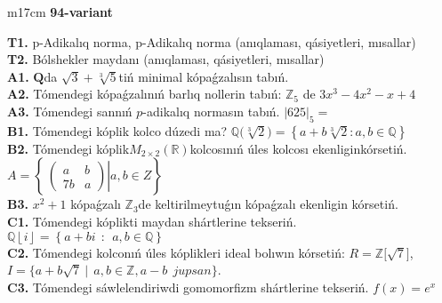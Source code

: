 \documentclass{article}
\begin{document}
\begin{tabular}{m{17cm}}
\textbf{94-variant}
\newline

\textbf{T1.} p-Adikalıq norma, p-Adikalıq norma (anıqlaması, qásiyetleri, mısallar) \\
\textbf{T2.} Bólshekler maydanı (anıqlaması, qásiyetleri, mısallar) \\
\textbf{A1.} \(\mathbf{Q}\)da \(\sqrt{3} + \sqrt[3]{5}\)tiń minimal kópaǵzalısın tabıń. \\
\textbf{A2.} Tómendegi kópaǵzalınıń barlıq nollerin tabıń: \(\mathbb{Z}_{5}\) de \(3x^{3} - 4x^{2} - x + 4\) \\
\textbf{A3.} Tómendegi sannıń \(p\)-adikalıq normasın tabıń. \(|625|_{5} =\) \\
\textbf{B1.} Tómendegi kóplik kolco dúzedi ma? \(\mathbb{Q(}\sqrt[3]{2}) = \left\{ a + b\sqrt[3]{2}:a,b \in \mathbb{Q} \right\}\) \\
\textbf{B2.} Tómendegi kóplik\(M_{2 \times 2}\left( \mathbb{R} \right)\)kolcosınıń úles kolcosı ekenliginkórsetiń. \(A = \left\{ \left. \ \begin{pmatrix}
a & b \\
7b & a
\end{pmatrix} \right|a,b \in Z \right\}\) \\
\textbf{B3.} \(x^{2} + 1\) kópaǵzalı \(\mathbb{Z}_{3}\)de keltirilmeytuǵın kópaǵzalı ekenligin kórsetiń. \\
\textbf{C1.} Tómendegi kóplikti maydan shártlerine tekseriń. \(\mathbb{Q}\left\lfloor i \right\rfloor = \left\{ a + bi\ \ :\ \ a,b\mathbb{\in Q} \right\}\) \\
\textbf{C2.} Tómendegi kolconıń úles kóplikleri ideal bolıwın kórsetiń:
\(R\mathbb{= Z\lbrack}\sqrt{7}\rbrack\), \(I = \{ a + b\sqrt{7}\ |\ \ a,b \in \mathbb{Z,}a - b\ \ jupsan\}\). \\
\textbf{C3.} Tómendegi sáwlelendiriwdi gomomorfizm shártlerine tekseriń. \(f(x) = e^{x}\) \\

\end{tabular}
\vspace{1cm}
\end{document}
